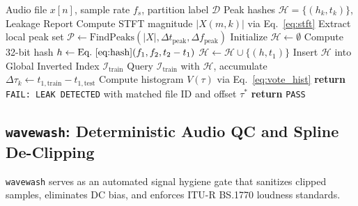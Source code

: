 \documentclass[10pt,journal,compsoc]{IEEEtran}
\begin{document}
\begin{algorithm}[t]
\caption{\texttt{splitsafe}: Landmark Hash Leakage Detection}
\label{alg:splitsafe}
\begin{algorithmic}[1]
\REQUIRE Audio file $x[n]$, sample rate $f_s$, partition label $\mathcal{D}$
\ENSURE Peak hashes $\mathcal{H} = \{(h_k, t_k)\}$, Leakage Report
\STATE Compute STFT magnitude $|X(m, k)|$ via Eq.~\eqref{eq:stft}
\STATE Extract local peak set $\mathcal{P} \leftarrow \text{FindPeaks}(|X|, \Delta t_{\text{peak}}, \Delta f_{\text{peak}})$
\STATE Initialize $\mathcal{H} \leftarrow \emptyset$
        \STATE Compute 32-bit hash $h \leftarrow \text{Eq.~\eqref{eq:hash}}(f_1, f_2, t_2 - t_1)$
        \STATE $\mathcal{H} \leftarrow \mathcal{H} \cup \{(h, t_1)\}$
    \ENDFOR
\ENDFOR
{}
    \STATE Insert $\mathcal{H}$ into Global Inverted Index $\mathcal{I}_{\text{train}}$
    \STATE Query $\mathcal{I}_{\text{train}}$ with $\mathcal{H}$, accumulate $\Delta \tau_k \leftarrow t_{1, \text{train}} - t_{1, \text{test}}$
    \STATE Compute histogram $V(\tau)$ via Eq.~\eqref{eq:vote_hist}
        \STATE \textbf{return} \texttt{FAIL: LEAK DETECTED} with matched file ID and offset $\tau^*$
    \ENDIF
\ENDIF
\STATE \textbf{return} \texttt{PASS}
\end{algorithmic}
\end{algorithm}

\subsection{\texttt{wavewash}: Deterministic Audio QC and Spline De-Clipping}
\texttt{wavewash} serves as an automated signal hygiene gate that sanitizes clipped samples, eliminates DC bias, and enforces ITU-R BS.1770 loudness standards.
\end{document}
